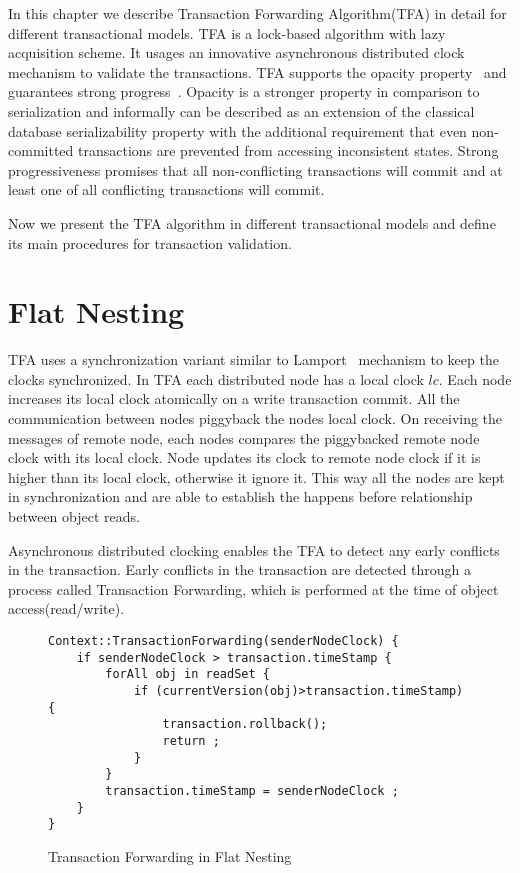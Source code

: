 \documentclass[12pt,english]{report}
\begin{document}
In this chapter we describe Transaction Forwarding Algorithm(TFA) in detail for different transactional models. TFA is a lock-based algorithm with lazy acquisition scheme. It usages an innovative asynchronous distributed clock mechanism to validate the transactions. TFA supports the opacity property~\cite{guerraoui2009semantics} and guarantees  strong progress~\cite{guerraoui2009semantics}. Opacity is a stronger property in comparison to serialization and informally can be described as an extension of the classical database serializability property with the additional requirement that even non-committed transactions are prevented from accessing inconsistent states. Strong progressiveness promises that all non-conflicting transactions will commit and at least one of all conflicting transactions will commit.  
 
Now we present the TFA algorithm in different transactional models and define its main procedures for transaction validation.
 
\section{Flat Nesting}
TFA uses a synchronization variant similar to Lamport~\cite{lamport1978time} mechanism to keep the clocks synchronized. In TFA each distributed node has a local clock $lc$. Each node increases its local clock atomically on a write transaction commit. All the communication between nodes piggyback the nodes local clock. On receiving the messages of remote node, each nodes compares the piggybacked remote node clock with its local clock. Node updates its clock to remote node clock if it is higher than its local clock, otherwise it ignore it. This way all the nodes are kept in synchronization and are able to establish the happens before relationship between object reads. 

Asynchronous distributed clocking enables the TFA to detect any early conflicts in the transaction. Early conflicts in the transaction are detected through a process called Transaction Forwarding, which is performed at the time of object access(read/write). 

\begin{figure}
\begin{minipage}[b]{0.9\linewidth}\centering
\begin{lstlisting}
Context::TransactionForwarding(senderNodeClock) {
	if senderNodeClock > transaction.timeStamp {
		forAll obj in readSet {
			if (currentVersion(obj)>transaction.timeStamp) { 
				transaction.rollback();
				return ;		
			}
		}
		transaction.timeStamp = senderNodeClock ; 
	}
}
\end{lstlisting}
\end{minipage}
\caption{Transaction Forwarding in Flat Nesting}
\label{Fig:FlatTFA}
\end{figure}
\end{document}
